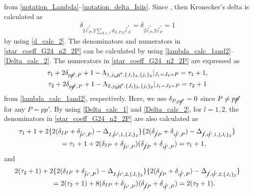 \documentclass[pdftex]{sigma}
\numberwithin{equation}{section}
\begin{document}
from \eqref{notation_Lambda}--\eqref{notation_delta_Isiis}. Since
,
then Kronecker's delta is calculated as
\begin{align}
 \delta_{
 2
 \vec{e}_{P}^{\ast},
 2
 \sum_{
 X
 \in
 \mathcal{I}
 }
 d_{
 X,
 P,
 p
 }
 \vec{e}_{X}^{\ast}
 }
 =
 \delta_{
 2
 \vec{e}_{P}^{\ast},
 2
 \vec{e}_{P}^{\ast}
 }
 =
 1
 \label{K_delta_calc_2}
\end{align}
by using \eqref{d_calc_2}. The denominators and numerators in \eqref{star_coeff_G24_n2_2P} can be calculated by using \eqref{lambda_calc_1and2}--\eqref{Delta_calc_2}. The numerators in \eqref{star_coeff_G24_n2_2P} are expressed as
\begin{gather*}%
\tau_{1}
+
2
\delta_{p\cancel{p}',P}
+
1
-
\Lambda_{
1,
j_{1}\cancel{j_{1}}',
\{
J_{i}
\}_{2},
\{
j_{i}
\}_{2}
}
|_{J_{1}=J_{2}=P}
=
\tau_{1}
+
1,
\\
\tau_{2}
+
2
\delta_{p\cancel{p}',P}
+
1
-
\Lambda_{
2,
j_{2}\cancel{j_{2}}',
\{
J_{i}
\}_{2},
\{
j_{i}
\}_{2}
}
|_{J_{1}=J_{2}=P}
=
\tau_{2}
+
1
\end{gather*}
from \eqref{lambda_calc_1and2}, respectively. Here, we use
$
\delta_{
P,
p\cancel{p}'
}
=
0
$
since
$
P
\neq
p\cancel{p}'
$
for any
$
P
=
pp'
$.
By using \eqref{Delta_calc_1} and \eqref{Delta_calc_2}, for $l=1,2$, the denominators in \eqref{star_coeff_G24_n2_2P} are also calculated as
\begin{gather*}%
\tau_{1}
+
1
+
2
\{
 2
 (
 \delta_{IP}
 +
 \delta_{\cancel{i}i',P}
 )
 -
 \Delta_{
 I,
 \cancel{i}i',
 1,
 \{
 J_{i}
\}_{2}
}
\}
\{
 2
 (
 \delta_{\cancel{I}P}
 +
 \delta_{i\cancel{i}',P}
 )
 -
 \Delta_{
 \cancel{I},
 i\cancel{i}',
 1,
 \{
 J_{i}
 \}_{2}
 }
\}
\\
\qquad=
\tau_{1}
+
1
+
2
 (
 \delta_{IP}
 +
 \delta_{\cancel{i}i',P}
 )
 (
 \delta_{\cancel{I}P}
 +
 \delta_{i\cancel{i}',P}
 )
=
\tau_{1}
+
1,
\end{gather*}
and
\begin{gather}
2
 (
\tau_{2}
+
1
 )
+
2
\{
 2
 (
 \delta_{IP}
 +
 \delta_{\cancel{i}i',P}
 )
 -
 \Delta_{
 I,
 \cancel{i}i',
 2,
 \{
 J_{i}
\}_{2}
}
\}
\{
 2
 (
 \delta_{\cancel{I}P}
 +
 \delta_{i\cancel{i}',P}
 )
 -
 \Delta_{
 \cancel{I},
 i\cancel{i}',
 2,
 \{
 J_{i}
 \}_{2}
 }
\}
\nonumber
\\
\qquad=
2
 (
\tau_{2}
+
1
 )
+
8
 (
 \delta_{IP}
 +
 \delta_{\cancel{i}i',P}
 )
 (
 \delta_{\cancel{I}P}
 +
 \delta_{i\cancel{i}',P}
 )
=
2
 (
\tau_{2}
+
1
 ).
\label{denominator_2}
\end{gather}
\end{document}
